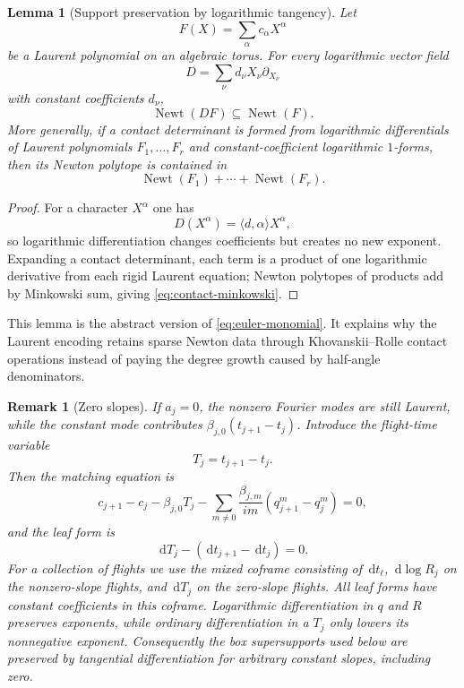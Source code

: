 \documentclass[11pt]{article}
\newtheorem{lemma}[theorem]{Lemma}
\newtheorem{remark}[theorem]{Remark}
\newcommand{\Newt}{\operatorname{Newt}}
\newcommand{\dd}{\,\mathrm d}
\begin{document}
\begin{lemma}[Support preservation by logarithmic tangency]\label{lem:log-support}
Let
\[
 F(X)=\sum_{\alpha}c_\alpha X^\alpha
\]
be a Laurent polynomial on an algebraic torus.  For every logarithmic vector field
\[
 D=\sum_{\nu}d_\nu X_\nu\partial_{X_\nu}
\]
with constant coefficients $d_\nu$,
\begin{equation}\label{eq:log-support-preservation}
 \Newt(DF)\subseteq\Newt(F).
\end{equation}
More generally, if a contact determinant is formed from logarithmic differentials of Laurent polynomials $F_1,\ldots,F_r$ and constant-coefficient logarithmic $1$-forms, then its Newton polytope is contained in
\begin{equation}\label{eq:contact-minkowski}
 \Newt(F_1)+\cdots+\Newt(F_r).
\end{equation}
\end{lemma}

\begin{proof}
For a character $X^\alpha$ one has
\[
 D(X^\alpha)=\langle d,\alpha\rangle X^\alpha,
\]
so logarithmic differentiation changes coefficients but creates no new exponent.  Expanding a contact determinant, each term is a product of one logarithmic derivative from each rigid Laurent equation; Newton polytopes of products add by Minkowski sum, giving \eqref{eq:contact-minkowski}.
\end{proof}

This lemma is the abstract version of \eqref{eq:euler-monomial}.  It explains why the Laurent encoding retains sparse Newton data through Khovanskii--Rolle contact operations instead of paying the degree growth caused by half-angle denominators.

\begin{remark}[Zero slopes]\label{rem:zero-slope}
If $a_j=0$, the nonzero Fourier modes are still Laurent, while the constant mode contributes $\beta_{j,0}(t_{j+1}-t_j)$.  Introduce the flight-time variable
\[
 T_j=t_{j+1}-t_j.
\]
Then the matching equation is
\[
 c_{j+1}-c_j-\beta_{j,0}T_j-
 \sum_{m\ne0}\frac{\beta_{j,m}}{im}
 (q_{j+1}^m-q_j^m)=0,
\]
and the leaf form is
\[
 \dd T_j-(\dd t_{j+1}-\dd t_j)=0.
\]
For a collection of flights we use the mixed coframe consisting of
$\dd t_\ell$, $\dd\log R_j$ on the nonzero-slope flights, and $\dd T_j$ on the zero-slope flights.  All leaf forms have constant coefficients in this coframe.  Logarithmic differentiation in $q$ and $R$ preserves exponents, while ordinary differentiation in a $T_j$ only lowers its nonnegative exponent.  Consequently the box supersupports used below are preserved by tangential differentiation for arbitrary constant slopes, including zero.
\end{remark}
\end{document}
